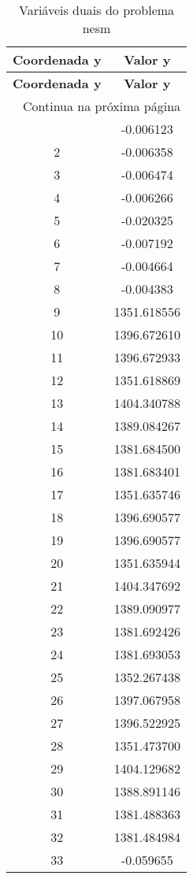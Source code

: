 \documentclass[12pt]{article}
\begin{document}
\begin{longtable}{@{}cc@{}}
\caption{Variáveis duais do problema nesm} \\
\toprule
\textbf{Coordenada y} & \textbf{Valor y} \\
\midrule
\endfirsthead

\toprule
\textbf{Coordenada y} & \textbf{Valor y} \\
\midrule
\endhead

\midrule \multicolumn{2}{r}{{Continua na próxima página}} \\ \midrule
\endfoot

\bottomrule
\endlastfoot
1 & -0.006123 \\
2 & -0.006358 \\
3 & -0.006474 \\
4 & -0.006266 \\
5 & -0.020325 \\
6 & -0.007192 \\
7 & -0.004664 \\
8 & -0.004383 \\
9 & 1351.618556 \\
10 & 1396.672610 \\
11 & 1396.672933 \\
12 & 1351.618869 \\
13 & 1404.340788 \\
14 & 1389.084267 \\
15 & 1381.684500 \\
16 & 1381.683401 \\
17 & 1351.635746 \\
18 & 1396.690577 \\
19 & 1396.690577 \\
20 & 1351.635944 \\
21 & 1404.347692 \\
22 & 1389.090977 \\
23 & 1381.692426 \\
24 & 1381.693053 \\
25 & 1352.267438 \\
26 & 1397.067958 \\
27 & 1396.522925 \\
28 & 1351.473700 \\
29 & 1404.129682 \\
30 & 1388.891146 \\
31 & 1381.488363 \\
32 & 1381.484984 \\
33 & -0.059655 \\

\end{longtable}
\end{document}
